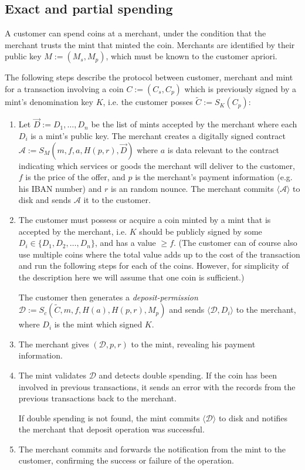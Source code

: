 \documentclass{llncs}
\begin{document}
\subsection{Exact and partial spending}

A customer can spend coins at a merchant, under the condition that the
merchant trusts the mint that minted the coin.  Merchants are
identified by their public key $M := (M_s, M_p)$, which must be known
to the customer apriori.

The following steps describe the protocol between customer, merchant and mint
for a transaction involving a coin $C := (C_s, C_p)$ which is previously signed
by a mint's denomination key $K$, i.e. the customer posses
$\widetilde{C} := S_K(C_p)$:

\begin{enumerate}
\item\label{contract} Let $\vec{D} := D_1, \ldots, D_n$ be the list of
  mints accepted by the merchant where each $D_i$ is a mint's public
  key.  The merchant creates a digitally signed contract $\mathcal{A}
  := S_M(m, f, a, H(p, r), \vec{D})$ where $a$ is data relevant to the
  contract indicating which services or goods the merchant will
  deliver to the customer, $f$ is the price of the offer, and $p$ is
  the merchant's payment information (e.g. his IBAN number) and $r$ is
  an random nounce.  The merchant commits $\langle \mathcal{A}
  \rangle$ to disk and sends $\mathcal{A}$ it to the customer.
\item\label{deposit} The customer must possess or acquire a coin minted by a mint that is
  accepted by the merchant, i.e. $K$ should be publicly signed by some $D_i
  \in \{D_1, D_2, \ldots, D_n\}$, and has a value $\geq f$. (The customer
  can of course also use multiple coins where the total value adds up to
  the cost of the transaction and run the following steps for each of
  the coins. However, for simplicity of the description here we will
  assume that one coin is sufficient.)

  The customer then generates a \emph{deposit-permission} $\mathcal{D} :=
  S_c(\widetilde{C}, m, f, H(a), H(p,r), M_p)$ 
  and sends $\langle \mathcal{D}, D_i\rangle$ to the merchant,
  where $D_i$ is the mint which signed $K$.
\item The merchant gives $(\mathcal{D}, p, r)$ to the mint, revealing his
  payment information.

\item The mint validates $\mathcal{D}$ and detects double spending.
  If the coin has been involved in previous transactions, it sends an error
  with the records from the previous transactions back to the merchant.

  If double spending is not found, the mint commits $\langle \mathcal{D} \rangle$ to disk
  and notifies the merchant that deposit operation was successful.

\item The merchant commits and forwards the notification from the mint to the
  customer, confirming the success or failure of the operation.
\end{enumerate}
\end{document}
